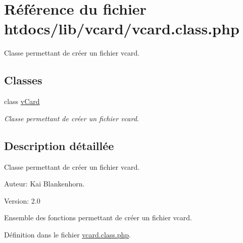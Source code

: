 \hypertarget{vcard_8class_8php}{
\section{R\'{e}f\'{e}rence du fichier htdocs/lib/vcard/vcard.class.php}
\label{vcard_8class_8php}
}
Classe permettant de cr\'{e}er un fichier vcard.  


\subsection*{Classes}
\begin{CompactItemize}
\item 
class \hyperlink{classvCard}{v\-Card}
\begin{CompactList}\small\item\em Classe permettant de cr\'{e}er un fichier vcard. \item\end{CompactList}\end{CompactItemize}


\subsection{Description d\'{e}taill\'{e}e}
Classe permettant de cr\'{e}er un fichier vcard. 

\begin{Desc}
\item[Auteur:]Kai Blankenhorn. \end{Desc}
\begin{Desc}
\item[Version:]2.0\end{Desc}
Ensemble des fonctions permettant de cr\'{e}er un fichier vcard.

D\'{e}finition dans le fichier \hyperlink{vcard_8class_8php-source}{vcard.class.php}.